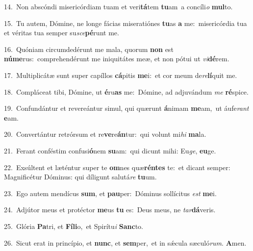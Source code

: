 {\numbfont\textcolor{\numbcolor}{14.}}~Non abscóndi misericórdiam tuam et veri\-\textbf{tá}\-tem \textbf{tu}\-am~\star a concíli\textit{o} \textbf{mul}\-to.\par
{\numbfont\textcolor{\numbcolor}{15.}}~Tu autem, Dómine, ne longe fácias miseratiónes \textbf{tu}\-as \textbf{a} me:~\star misericórdia tua et véritas tua semper su\-\textit{sce}\-\textbf{pé}runt me.\par
{\numbfont\textcolor{\numbcolor}{16.}}~Quóniam circumdedérunt me mala, quorum \textbf{non} est \textbf{nú}\-\textbf{me}rus:~\star comprehendérunt me iniquitátes meæ, et non pótui ut \textit{vi}\-\textbf{dé}rem.\par
{\numbfont\textcolor{\numbcolor}{17.}}~Multiplicátæ sunt super capíllos \textbf{cá}\-pitis \textbf{me}\-i:~\star et cor meum de\-\textit{re}\-\textbf{lí}quit me.\par
{\numbfont\textcolor{\numbcolor}{18.}}~Compláceat tibi, Dómine, ut \textbf{é}\-ru\textbf{as} me:~\star Dómine, ad adjuvándum \textit{me} \textbf{ré}\-spice.\par
{\numbfont\textcolor{\numbcolor}{19.}}~Confundántur et revereántur simul, qui quærunt \textbf{á}\-nimam \textbf{me}\-am,~\star ut áufe\textit{rant} \textbf{e}\-am.\par
{\numbfont\textcolor{\numbcolor}{20.}}~Convertántur retrórsum et re\-\textbf{ve}\-re\-\textbf{án}\-tur:~\star qui volunt mi\textit{hi} \textbf{ma}\-la.\par
{\numbfont\textcolor{\numbcolor}{21.}}~Ferant conféstim confusi\-\textbf{ó}\-nem \textbf{su}\-am:~\star qui dicunt mihi: Eu\-\textit{ge}\-, \textbf{eu}\-ge.\par
{\numbfont\textcolor{\numbcolor}{22.}}~Exsúltent et læténtur super te \textbf{om}\-nes quæ\-\textbf{rén}\-\textbf{tes} te:~\star et dicant semper: Magnificétur Dóminus: qui díligunt salutá\textit{re} \textbf{tu}\-um.\par
{\numbfont\textcolor{\numbcolor}{23.}}~Ego autem mendícus \textbf{sum}\-, et \textbf{pau}\-per:~\star Dóminus sollícitus \textit{est} \textbf{me}\-i.\par
{\numbfont\textcolor{\numbcolor}{24.}}~Adjútor meus et protéctor \textbf{me}\-us \textbf{tu} es:~\star Deus meus, ne \textit{tar}\-\textbf{dá}veris.\par
{\numbfont\textcolor{\numbcolor}{25.}}~Glória \textbf{Pa}\-tri, et \textbf{Fí}\-\textbf{li}o,~\star et Spirítu\textit{i} \textbf{Sanc}\-to.\par
{\numbfont\textcolor{\numbcolor}{26.}}~Sicut erat in princípio, et \textbf{nunc}\-, et \textbf{sem}\-per,~\star et in sǽcula sæculó\-\textit{rum}\-. \textbf{A}\-men.\par
